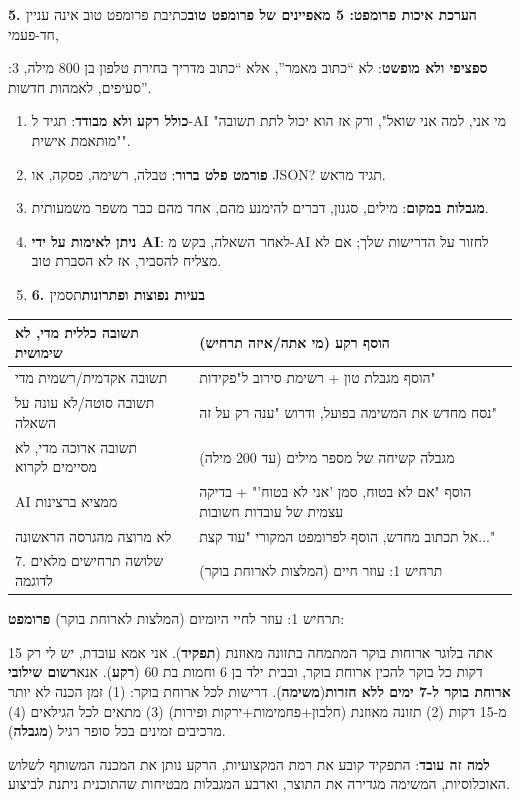 \textbf{5. הערכת איכות פרומפט: 5 מאפיינים של פרומפט טוב}כתיבת פרומפט טוב אינה עניין חד-פעמי,


:\textbf{ספציפי ולא מופשט}: לא “כתוב מאמר”, אלא “כתוב מדריך בחירת טלפון בן 800 מילה, 3 סעיפים, לאמהות חדשות”.

\begin{enumerate}
  \item \textbf{כולל רקע ולא מבודד}: תגיד ל-AI "מי אני, למה אני שואל", ורק אז הוא יכול לתת תשובה "מותאמת אישית".
  \item \textbf{פורמט פלט ברור}: טבלה, רשימה, פסקה, או JSON? תגיד מראש.
  \item \textbf{מגבלות במקום}: מילים, סגנון, דברים להימנע מהם, אחד מהם כבר משפר משמעותית.
  \item \textbf{ניתן לאימות על ידי AI}: לאחר השאלה, בקש מ-AI לחזור על הדרישות שלך; אם לא מצליח להסביר, אז לא הסברת טוב.
  \item \textbf{6. בעיות נפוצות ופתרונות}תסמין
\end{enumerate}


\begin{center}
\begin{tabularx}{\linewidth}{|X|X|}
\hline
\textbf{תשובה כללית מדי, לא שימושית} & \textbf{הוסף רקע (מי אתה/איזה תרחיש)} \tabularnewline
\hline
תשובה אקדמית/רשמית מדי & הוסף מגבלת טון + רשימת סירוב ל"פקידות" \tabularnewline
תשובה סוטה/לא עונה על השאלה & נסח מחדש את המשימה בפועל, ודרוש "ענה רק על זה" \tabularnewline
תשובה ארוכה מדי, לא מסיימים לקרוא & מגבלה קשיחה של מספר מילים (עד 200 מילה) \tabularnewline
AI ממציא ברצינות & הוסף "אם לא בטוח, סמן 'אני לא בטוח'" + בדיקה עצמית של עובדות חשובות \tabularnewline
לא מרוצה מהגרסה הראשונה & אל תכתוב מחדש, הוסף לפרומפט המקורי "עוד קצת..." \tabularnewline
7. שלושה תרחישים מלאים לדוגמה & תרחיש 1: עוזר חיים (המלצות לארוחת בוקר) \tabularnewline
\hline
\end{tabularx}
\end{center}


\begin{tcbinfo}{תרחיש 1: עוזר לחיי היומיום (המלצות לארוחת בוקר)}
\textbf{פרומפט}:

אתה בלוגר ארוחות בוקר המתמחה בתזונה מאוזנת (\textbf{תפקיד}). אני אמא עובדת, יש לי רק 15 דקות כל בוקר להכין ארוחת בוקר, ובבית ילד בן 6 וחמות בת 60 (\textbf{רקע}). אנא\textbf{רשום שילובי ארוחת בוקר ל-7 ימים ללא חזרות}(\textbf{משימה}). דרישות לכל ארוחת בוקר: (1) זמן הכנה לא יותר מ-15 דקות (2) תזונה מאוזנת (חלבון+פחמימות+ירקות ופירות) (3) מתאים לכל הגילאים (4) מרכיבים זמינים בכל סופר רגיל (\textbf{מגבלה}).

\textbf{למה זה עובד}: התפקיד קובע את רמת המקצועיות, הרקע נותן את המכנה המשותף לשלוש האוכלוסיות, המשימה מגדירה את התוצר, וארבע המגבלות מבטיחות שהתוכנית ניתנת לביצוע.

\end{tcbinfo}

